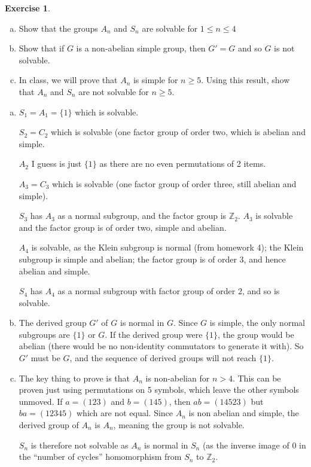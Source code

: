\documentclass[11pt,oneside]{article}
\numberwithin{equation}{section}
\theoremstyle{definition}
\newtheorem{exercise}{Exercise}
\def\ZZ{\mathbb{Z}}
\begin{document}
\begin{exercise}
  \begin{enumerate}[(a)]
  \item
    Show that the groups $A_n$ and $S_n$ are solvable for $1 \leq n \leq 4$
  \item
    Show that if $G$ is a non-abelian simple group, then $G' = G$ and so $G$
    is not solvable.  
  \item
    In class, we will prove that $A_n$ is simple for $n \geq 5$.  Using this result, show that
    $A_n$ and $S_n$ are not solvable for $n \geq 5$. 
  \end{enumerate}
\end{exercise}
\begin{solution}
  \begin{enumerate}[(a)]
  \item
    $S_1 = A_1= \{1\}$ which is solvable.

    $S_2 = C_2$ which is solvable (one factor group of order two, which is abelian and simple.

    $A_2$ I guess is just $\{1\}$ as there are no even permutations of 2 items.

    $A_3 = C_3$ which is solvable (one factor group of order three, still abelian and simple).

    $S_3$ has $A_3$ as a normal subgroup, and the factor group is $\ZZ_2$.  $A_3$ is solvable and
    the factor group is of order two, simple and abelian.

    $A_4$ is solvable, as the Klein subgroup is normal (from homework
    4); the Klein subgroup is simple and abelian; the factor group is
    of order 3, and hence abelian and simple.

    $S_4$ has $A_4$ as a normal subgroup with factor group of order $2$, and so is solvable.  
  \item
    The derived group $G'$ of $G$ is normal in $G$.  Since $G$ is simple, the only
    normal subgroups are $\{1\}$ or $G$.  If the derived group were $\{1\}$, the group
    would be abelian (there would be no non-identity commutators to generate it with).
    So $G'$ must be $G$, and the sequence of derived groups will not reach $ \{ 1 \}$.  
  \item
    The key thing to prove is that $A_n$ is non-abelian for $n>4$.  This can be proven just using
    permutations on 5 symbols, which leave the other symbols unmoved. If $a = (1 2 3)$ and
    $b = (1 4 5)$, then $ab = (1 4 5 2 3)$ but $ba = (1 2 3 4 5)$ which are not equal.  Since
    $A_n$ is non abelian and simple, the derived group of $A_n$ is $A_n$, meaning the group is not solvable.

    $S_n$ is therefore not solvable as $A_n$ is normal in $S_n$ (as the inverse image of 0 in the
    ``number of cycles'' homomorphism from $S_n$ to $\ZZ_2$. 

  \end{enumerate}
\end{solution}
\end{document}
